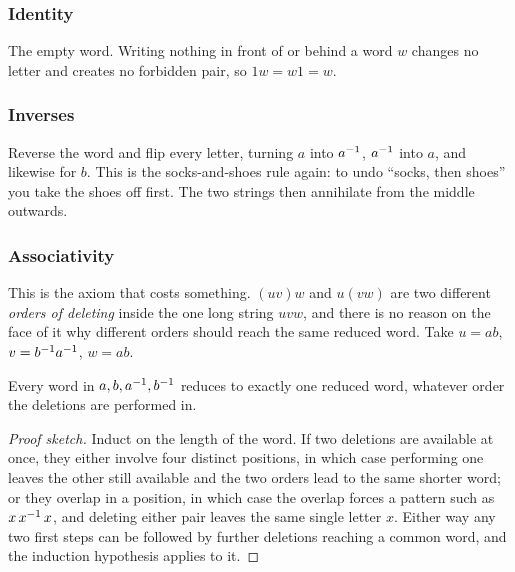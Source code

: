 
\subsubsection*{Identity}

The empty word. Writing nothing in front of or behind a word $w$ changes no letter and creates no
forbidden pair, so $1w=w1=w$.


\subsubsection*{Inverses}

Reverse the word and flip every letter, turning $a$ into $a^{-1}$, $a^{-1}$ into $a$, and likewise for
$b$. This is the socks-and-shoes rule again: to undo ``socks, then shoes'' you take the shoes off
first. The two strings then annihilate from the middle outwards.


\subsubsection*{Associativity}

This is the axiom that costs something. $(uv)w$ and $u(vw)$ are two different \emph{orders of
deleting} inside the one long string $uvw$, and there is no reason on the face of it why different
orders should reach the same reduced word. Take $u=ab$, $v=b^{-1} a^{-1}$, $w=ab$.



\begin{thm}\label{thm:unique}
Every word in $a,b,a^{-1},b^{-1}$ reduces to exactly one reduced word, whatever order the deletions
are performed in.
\end{thm}

\begin{proof}[Proof sketch]
Induct on the length of the word. If two deletions are available at once, they either involve four
distinct positions, in which case performing one leaves the other still available and the two orders
lead to the same shorter word; or they overlap in a position, in which case the overlap forces a
pattern such as $x\,x^{-1}\,x$, and deleting either pair leaves the same single letter $x$. Either
way any two first steps can be followed by further deletions reaching a common word, and the
induction hypothesis applies to it.
\end{proof}

